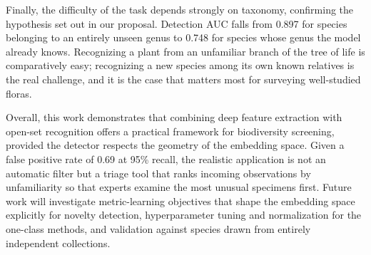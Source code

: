 \documentclass[11pt]{article}
\begin{document}
Finally, the difficulty of the task depends strongly on taxonomy, confirming the hypothesis set out in our proposal. Detection AUC falls from 0.897 for species belonging to an entirely unseen genus to 0.748 for species whose genus the model already knows. Recognizing a plant from an unfamiliar branch of the tree of life is comparatively easy; recognizing a new species among its own known relatives is the real challenge, and it is the case that matters most for surveying well-studied floras.

Overall, this work demonstrates that combining deep feature extraction with open-set recognition offers a practical framework for biodiversity screening, provided the detector respects the geometry of the embedding space. Given a false positive rate of 0.69 at 95\% recall, the realistic application is not an automatic filter but a triage tool that ranks incoming observations by unfamiliarity so that experts examine the most unusual specimens first. Future work will investigate metric-learning objectives that shape the embedding space explicitly for novelty detection, hyperparameter tuning and normalization for the one-class methods, and validation against species drawn from entirely independent collections.



\end{document}

